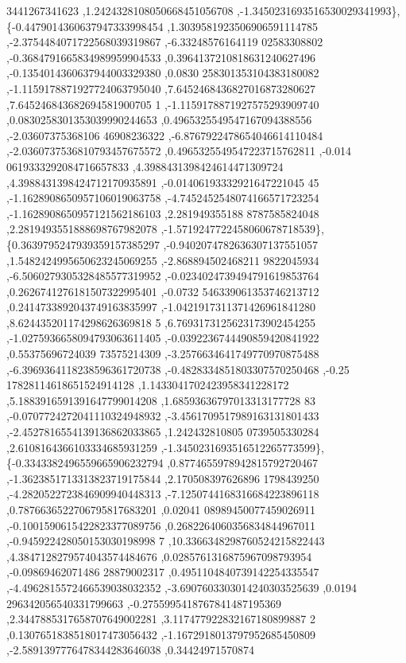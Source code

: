 \begin{DoxyCode}
      3441267341623 ,1.2424328108050668451056708 ,-1.3450231693516530029341993\},
\{-0.4479014360637947333998454 ,1.3039581923506906591114785 ,-2.3754484071722568039319867 ,-6.33248576164119
      02583308802 ,-0.3684791665834989959904533 ,0.3964137210818631240627496 ,-0.1354014360637944003329380 ,0.0830
      258301353104383180082 ,-1.1159178871927724063795040 ,7.6452468436827016873280627 ,7.645246843682694581900705
      1 ,-1.1159178871927575293909740 ,0.0830258301353039990244653 ,0.4965325549547167094388556 ,-2.03607375368106
      46908236322 ,-6.8767922478654046614110484 ,-2.0360737536810793457675572 ,0.4965325549547223715762811 ,-0.014
      0619333292084716657833 ,4.3988431398424614471309724 ,4.3988431398424712170935891 ,-0.01406193332921647221045
      45 ,-1.1628908650957106019063758 ,-4.7452452548074166571723254 ,-1.1628908650957121562186103 ,2.281949355188
      8787585824048 ,2.2819493551888698767982078 ,-1.5719247722458060678718539\},
\{0.3639795247939359157385297 ,-0.9402074782636307137551057 ,1.5482424995650623245069255 ,-2.868894502468211
      9822045934 ,-6.5060279305328485577319952 ,-0.0234024739494791619853764 ,0.2626741276181507322995401 ,-0.0732
      546339061353746213712 ,0.2414733892043749163835997 ,-1.0421917311371426961841280 ,8.624435201174298626369818
      5 ,6.7693173125623173902454255 ,-1.0275936658094793063611405 ,-0.0392236744490859420841922 ,0.55375696724039
      73575214309 ,-3.2576634641749770970875488 ,-6.3969364118238596361720738 ,-0.4828334851803307570250468 ,-0.25
      17828114618651524914128 ,1.1433041702423958341228172 ,5.1883916591391647799014208 ,1.68593636797013313177728
      83 ,-0.0707724272041110324948932 ,-3.4561709517989163131801433 ,-2.4527816554139136862033865 ,1.242432810805
      0739505330284 ,2.6108164366103334685931259 ,-1.3450231693516512265773599\},
\{-0.3343382496559665906232794 ,0.8774655978942815792720467 ,-1.3623851713313823719175844 ,2.170508397626896
      1798439250 ,-4.2820522723846909940448313 ,-7.1250744168316684223896118 ,0.7876636522706795817683201 ,0.02041
      08989450077459026911 ,-0.1001590615422823377089756 ,0.2682264060356834844967011 ,-0.945922428050153030198998
      7 ,10.3366348298760524215822443 ,4.3847128279574043574484676 ,0.0285761316875967098793954 ,-0.09869462071486
      28879002317 ,0.4951104840739142254335547 ,-4.4962815572466539038032352 ,-3.6907603303014240303525639 ,0.0194
      296342056540331799663 ,-0.2755995418767841487195369 ,2.3447885317658707649002281 ,3.117477922832167180899887
      2 ,0.1307651838518017473056432 ,-1.1672918013797952685450809 ,-2.5891397776478344283646038 ,0.34424971570874

\end{DoxyCode}
